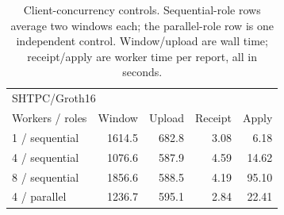 \begin{table}[t]
\centering
\caption{Client-concurrency controls. Sequential-role rows average two
windows each; the parallel-role row is one independent control.
Window/upload are wall time; receipt/apply are worker time per report,
all in seconds.}
\label{tab:concurrency-cost}
\footnotesize
\setlength{\tabcolsep}{3pt}
\begin{tabular}{@{}lrrrr@{}}
\toprule
\multicolumn{5}{l}{SHTPC/Groth16~\cite{Groth2016pairing}} \\
Workers / roles & Window & Upload & Receipt & Apply \\
\midrule
1 / sequential & 1614.5 & 682.8 & 3.08 & 6.18 \\
4 / sequential & 1076.6 & 587.9 & 4.59 & 14.62 \\
8 / sequential & 1856.6 & 588.5 & 4.19 & 95.10 \\
4 / parallel & 1236.7 & 595.1 & 2.84 & 22.41 \\
\bottomrule
\end{tabular}
\end{table}
